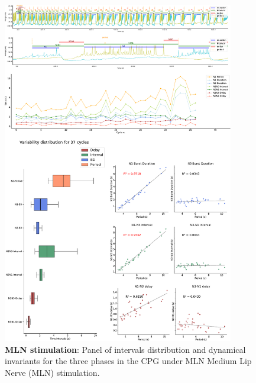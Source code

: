 \begin{figure}[htbp]
	\centering
	\includegraphics[width=0.9\textwidth]{./img/invariants/data/SUSSEX/MLN_driven/images/panel_with_intervals.pdf}
	\caption{\textbf{MLN stimulation}: Panel of intervals distribution and dynamical invariants for the three phases in the CPG under MLN Medium Lip Nerve (MLN) stimulation.}
	\label{fig:mln stimulation}
\end{figure}


